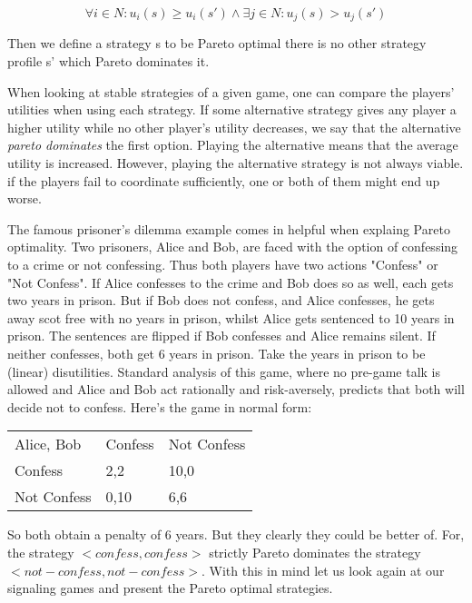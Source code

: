 \documentclass{article}
\begin{document}
\begin{equation*}
\forall i \in N: u_i(s) \geq u_i(s') \land \exists j \in N: u_j(s) > u_j(s')
\end{equation*}

Then we define a strategy s to be Pareto optimal there is no other strategy profile s' which Pareto dominates it. %


When looking at stable strategies of a given game, one can compare the players' utilities when using each strategy. If some alternative strategy gives any player a higher utility while no other player's utility decreases, we say that the alternative \textit{pareto dominates} the first option. Playing the alternative means that the average utility is increased. However, playing the alternative strategy is not always viable. if the players fail to coordinate sufficiently, one or both of them might end up worse. 

The famous prisoner's dilemma example comes in helpful when explaing Pareto optimality. Two prisoners, Alice and Bob, are faced with the option of confessing to a crime or not confessing. Thus both players have two actions "Confess" or "Not Confess". If Alice confesses to the crime and Bob does so as well, each gets two years in prison. But if Bob does not confess, and Alice confesses, he gets away scot free with no years in prison, whilst Alice gets sentenced to 10 years in prison. The sentences are flipped if Bob  confesses and Alice remains silent. If neither confesses, both get 6 years in prison. Take the years in prison to be (linear) disutilities. Standard analysis of this game, where no pre-game talk is allowed and Alice and Bob act rationally and risk-aversely, predicts that both will decide not to confess. Here's the game in normal form:
\begin{table}[h]
\centering
\begin{tabular}{lll}
Alice, Bob   & Confess & Not Confess \\
Confess           & 2,2     & 10,0    \\
Not Confess        & 0,10    & 6,6
\end{tabular}
\end{table}
So both obtain a penalty of 6 years. But they clearly they could be better of. For, the strategy $<confess, confess>$ strictly Pareto dominates the strategy $<not-confess,not-confess>$.
With this in mind let us look again at our signaling games and present the Pareto optimal strategies.
\end{document}
